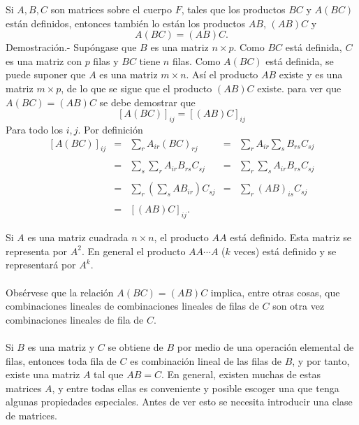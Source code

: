 \begin{teo}
    Si $A,B,C$ son matrices sobre el cuerpo $F$, tales que los productos $BC$ y $A(BC)$ están definidos, entonces también lo están los productos $AB$, $(AB)C$ y 
    $$A(BC)=(AB)C.$$
	Demostración.-\; Supóngase que $B$ es una matriz $n\times p$. Como $BC$ está definida, $C$ es una matriz con $p$ filas y $BC$ tiene $n$ filas. Como $A(BC)$ está definida, se puede suponer que $A$ es una matriz $m\times n$. Así el producto $AB$ existe y es una matriz $m\times p$, de lo que se sigue que el producto $(AB)C$ existe. para ver que $A(BC)=(AB)C$ se debe demostrar que
	$$\left[A(BC)\right]_{ij}=\left[(AB)C\right]_{ij}$$
	Para todo los $i,j$. Por definición
	$$\begin{array}{rclcl}
	    \left[A(BC)\right]_{ij} &=& \displaystyle\sum_{r} A_{ir}(BC)_{rj} &=& \displaystyle\sum_{r} A_{ir}\sum_{s} B_{rs}C_{sj}\\\\
				    &=& \displaystyle\sum_{s}\sum_{r} A_{ir}B_{rs}C_{sj} &=& \displaystyle\sum_{r}\sum_{s} A_{ir}B_{rs}C_{sj}\\\\
				    &=& \displaystyle\sum_{r}\left(\sum_{s} AB_{ir}\right)C_{sj} &=& \displaystyle\sum_{r} (AB)_{is}C_{sj}\\\\
				    &=& \left[(AB)C\right]_{ij}.&&
	\end{array}$$
\end{teo}
\vspace{0.3cm}

Si $A$ es una matriz cuadrada $n\times n$, el producto $AA$ está definido. Esta matriz se representa por $A^2$. En general el producto $AA\cdots A$ ($k$ veces) está definido y se representará por $A^k$.\\\\
Obsérvese que la relación $A(BC)=(AB)C$ implica, entre otras cosas, que combinaciones lineales de combinaciones lineales de filas de $C$ son otra vez combinaciones lineales de fila de $C$.\\\\
Si $B$ es una matriz y $C$ se obtiene de $B$ por medio de una operación elemental de filas, entonces toda fila de $C$ es combinación lineal de las filas de $B$, y por tanto, existe una matriz $A$ tal que $AB=C$. En general, existen muchas de estas matrices $A$, y entre todas ellas es conveniente y posible escoger una que tenga algunas propiedades especiales. Antes de ver esto se necesita introducir una clase de matrices.\\

